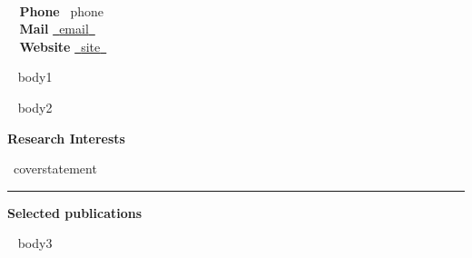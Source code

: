 \documentclass[a4paper]{article}
\newcommand{\block}[1]{\hrule \vspace{0.2cm} \textbf{\Large #1} \vspace{0.2cm}}
\newcommand{\blockNp}[1]{\newpage \textbf{\Large #1} \vspace{0.2cm}}
\newcommand{\skill}[2]{\textbf{#1} \hfill #2 \\}
\begin{document}
\begin{minipage}[c]{0.6\columnwidth}
    \\
\end{minipage} 
\hfill
\begin{minipage}[t]{0.375\columnwidth}
    \skill{\faPhone~ Phone}{~{{phone}}~}
    \skill{\faEnvelope~ Mail}{\href{mailto:~{{email}}~}{~{{email}}~}}
    \skill{\faGlobe~ Website}{\href{~{{site}}~}{~{{site}}~}}
\end{minipage}
\vspace{-0.25em}



\begin{minipage}[t]{0.6\columnwidth}
    ~{{ body1 }}~
\end{minipage} 
\hfill
\begin{minipage}[t]{0.375\columnwidth}
    ~{{ body2 }}~
\end{minipage}


\blockNp{Research Interests}

{~{{coverstatement}}~}

\vspace{0.3cm}

\block{Selected publications}
\nocite{Miti2021,Miti2019,Miti2019a}
\printbibliography[heading=none]
\vspace{.5em}

~{{ body3 }}~
\end{document}
